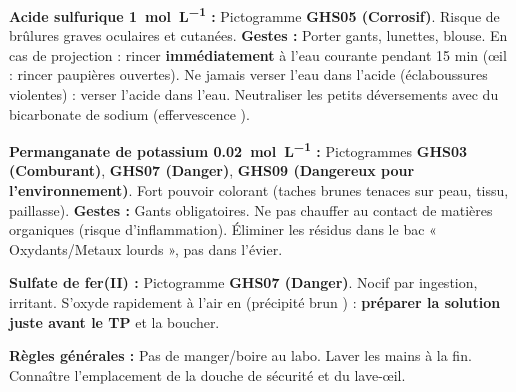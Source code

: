 \documentclass[11pt]{article}
\newcounter{popsec}
\newcounter{popsub}
\newcommand{\courssub}[1]{%
  \stepcounter{popsub}%
  \par\vspace{9pt}\noindent{\popxbold\fontsize{11.5}{13}\selectfont\color{popink}{\color{poporange}\thepopsec.\thepopsub}\hspace{6pt}#1}\par\nopagebreak\vspace{4pt}
}
\begin{document}
\courssub{Sécurité}
\begin{attention}
\textbf{Acide sulfurique  \SI{1}{mol.L^{-1}} :} Pictogramme \textbf{GHS05 (Corrosif)}. Risque de brûlures graves oculaires et cutanées. \textbf{Gestes :} Porter gants, lunettes, blouse. En cas de projection : rincer \textbf{immédiatement} à l'eau courante pendant 15 min (œil : rincer paupières ouvertes). Ne jamais verser l'eau dans l'acide (éclaboussures violentes) : verser l'acide dans l'eau. Neutraliser les petits déversements avec du bicarbonate de sodium  (effervescence ).

\textbf{Permanganate de potassium  \SI{0,02}{mol.L^{-1}} :} Pictogrammes \textbf{GHS03 (Comburant)}, \textbf{GHS07 (Danger)}, \textbf{GHS09 (Dangereux pour l'environnement)}. Fort pouvoir colorant (taches brunes  tenaces sur peau, tissu, paillasse). \textbf{Gestes :} Gants obligatoires. Ne pas chauffer au contact de matières organiques (risque d'inflammation). Éliminer les résidus dans le bac « Oxydants/Metaux lourds », pas dans l'évier.

\textbf{Sulfate de fer(II)  :} Pictogramme \textbf{GHS07 (Danger)}. Nocif par ingestion, irritant. S'oxyde rapidement à l'air en  (précipité brun ) : \textbf{préparer la solution juste avant le TP} et la boucher.

\textbf{Règles générales :} Pas de manger/boire au labo. Laver les mains à la fin. Connaître l'emplacement de la douche de sécurité et du lave-œil.
\end{attention}
\end{document}
